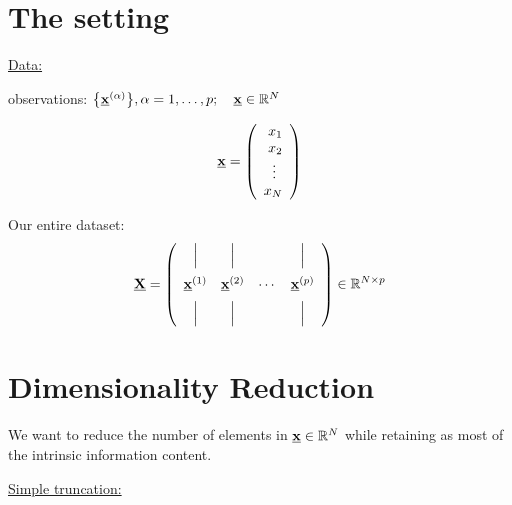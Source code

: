 \section{The setting}

\underline{Data:}

observations: $\big\{ \underline{\mathbf{x}}^{(\alpha)} \big\}, \alpha = 1, \ldots, p; \quad \underline{\mathbf{x}} \in \mathbb{R}^N$

$$
\underline{\mathbf{x}} = \left( \begin{array}{rrrrrrrrrrrrrrrrrrrrrrrrrr} 
x_1\\
x_2\\
\vdots\;\,\\
x_N
\\ \end{array} \right)
$$

Our entire dataset:
\[
\underline{\mathbf{X}} = 
\left(
\begin{array}{cccc}
\Big| & \Big| & &\Big| \\[3mm]
\underline{\mathbf{x}}^{(1)} & \underline{\mathbf{x}}^{(2)} & \cdots &\underline{\mathbf{x}}^{(p)}\\[2mm]
\Big| & \Big| & &\Big|
\end{array}
\right) \in \mathbb{R}^{N \times p}
\]

\section{Dimensionality Reduction}
\vspace{0.5cm}

We want to reduce the number of elements in $\underline{\mathbf{x}} \in \mathbb{R}^N$
while retaining as most of the intrinsic information content.



\newpage

\underline{Simple truncation:}

